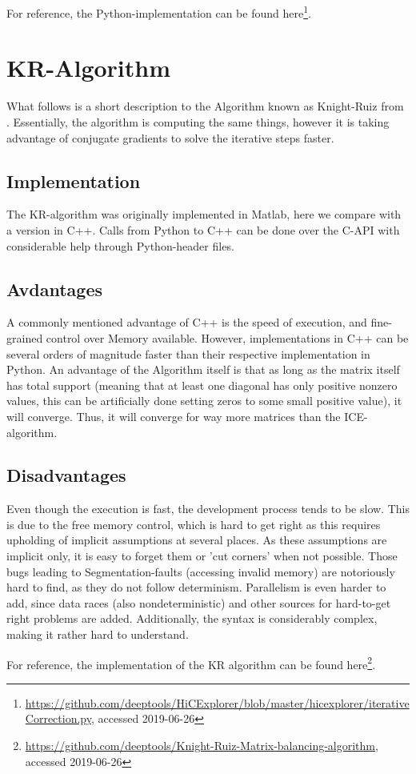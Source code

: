 For reference, the Python-implementation can be found
here\footnote{\url{https://github.com/deeptools/HiCExplorer/blob/master/hicexplorer/iterativeCorrection.py},
accessed 2019-06-26}.



\section{KR-Algorithm}\label{sec:KR}

What follows is a short description to the Algorithm known as Knight-Ruiz from
\cite{knight2013fast}. Essentially, the algorithm is computing the same things,
however it is taking advantage of conjugate gradients to solve the iterative
steps faster.

\subsection{Implementation}

The KR-algorithm was originally implemented in Matlab, here we compare with a
version in C++. Calls from Python to C++ can be done over the C-API with
considerable help through Python-header files.

\subsection{Avdantages}

A commonly mentioned advantage of C++ is the speed of execution, and
fine-grained control over Memory available. However, implementations in C++ can
be several orders of magnitude faster than their respective implementation in
Python. An advantage of the Algorithm itself is that as long as the matrix
itself has total support (meaning that at least one diagonal has only positive
nonzero values, this can be artificially done setting zeros to some small
positive value), it will converge. Thus, it will converge for way more matrices
than the ICE-algorithm. 

\subsection{Disadvantages}

Even though the execution is fast, the development process tends to be slow.
This is due to the free memory control, which is hard to get right as this
requires upholding of implicit assumptions at several places. As these
assumptions are implicit only, it is easy to forget them or 'cut corners' when
not possible. Those bugs leading to Segmentation-faults (accessing invalid
memory) are notoriously hard to find, as they do not follow determinism.
Parallelism is even harder to add, since data races (also nondeterministic) and
other sources for hard-to-get right problems are added. Additionally, the
syntax is considerably complex, making it rather hard to understand.

For reference, the implementation of the KR algorithm can be found here\footnote{\url{https://github.com/deeptools/Knight-Ruiz-Matrix-balancing-algorithm}, accessed 2019-06-26}.

